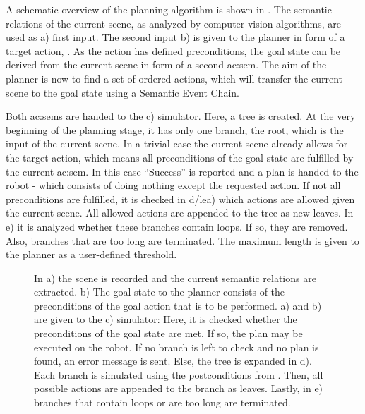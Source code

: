 A schematic overview of the planning algorithm is shown in .
The semantic relations of the current scene, as analyzed by computer vision algorithms, are used as a) first input.
The second input b) is given to the planner in form of a target action, \eg {}.
As the action has defined preconditions, the goal state can be derived from the current scene in form of a second \gls{ac:sem}.
The aim of the planner is now to find a set of ordered actions, which will transfer the current scene to the goal state using a Semantic Event Chain.


Both \glspl{ac:sem} are handed to the c) simulator.
Here, a tree is created.
At the very beginning of the planning stage, it has only one branch, the root, which is the input of the current scene.
In a trivial case the current scene already allows for the target action, which means all preconditions of the goal state are fulfilled by the current \gls{ac:sem}.
In this case ``Success'' is reported and a plan is handed to the robot - which consists of doing nothing except the requested action.
If not all preconditions are fulfilled, it is checked in d/lea) which actions are allowed given the current scene.
All allowed actions are appended to the tree as new leaves.
In e) it is analyzed whether these branches contain loops. 
If so, they are removed.
Also, branches that are too long are terminated.
The maximum length is given to the planner as a user-defined threshold.


\begin{figure}[]
  \centering
  
  \caption{In a) the scene is recorded and the current semantic relations are extracted. b) The goal state to the planner consists of the preconditions of the goal action that is to be performed. a) and b) are given to the c) simulator: Here, it is checked whether the preconditions of the goal state are met. If so, the plan may be executed on the robot. If no branch is left to check and no plan is found, an error message is sent. Else, the tree is expanded in d). Each branch is simulated using the postconditions from . Then, all possible actions are appended to the branch as leaves. Lastly, in e) branches that contain loops or are too long are terminated.}
  \label{fig:sec_usingaffordanceforplanning_planneroverview}
\end{figure}


